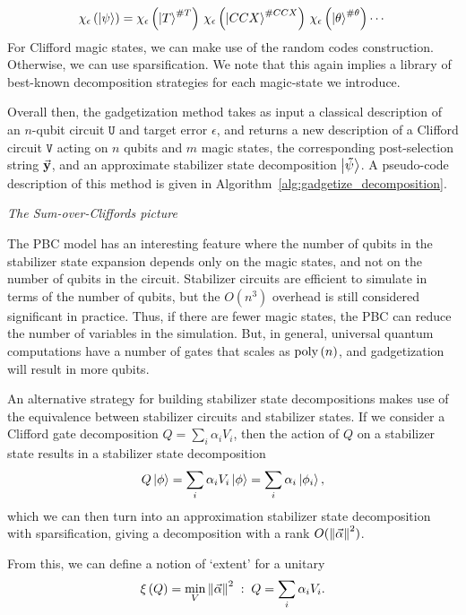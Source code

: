 \[\chi_{\epsilon}\left(\ket{\psi}\right) = \chi_{\epsilon}\left(\ket{T}^{\# T}\right)\,\chi_{\epsilon}\left(\ket{CCX}^{\# CCX}\right)\,\chi_{\epsilon}\left(\ket{\theta}^{\#\theta}\right)\cdots\]
For Clifford magic states, we can make use of the random codes construction. Otherwise, we can use sparsification. We note that this again implies a library of best-known decomposition strategies for each magic-state we introduce.\par
Overall then, the gadgetization method takes as input a classical description of an $n$-qubit circuit $\mathtt{U}$ and target error $\epsilon$, and returns a new description of a Clifford circuit $\mathtt{V}$ acting on $n$ qubits and $m$ magic states, the corresponding post-selection string $\va{y}$, and an approximate stabilizer state decomposition $\mathtt{\ket{\tilde{\psi}}}$. A pseudo-code description of this method is given in Algorithm~\ref{alg:gadgetize_decomposition}.\par
\large{\itshape{The Sum-over-Cliffords picture}}\par
The PBC model has an interesting feature where the number of qubits in the stabilizer state expansion depends only on the magic states, and not on the number of qubits in the circuit. Stabilizer circuits are efficient to simulate in terms of the number of qubits, but the $O(n^{3})$ overhead is still considered significant in practice. Thus, if there are fewer magic states, the PBC can reduce the number of variables in the simulation. But, in general, universal quantum computations have a number of gates that scales as $\text{poly}\left(n\right)$, and gadgetization will result in more qubits.\par
An alternative strategy for building stabilizer state decompositions makes use of the equivalence between stabilizer circuits and stabilizer states. If we consider a Clifford gate decomposition $Q=\sum_{i}\alpha_{i}V_{i}$, then the action of $Q$ on a stabilizer state results in a stabilizer state decomposition
\begin{equation}
Q\ket{\phi} = \sum_{i}\alpha_{i}V_{i}\ket{\phi} = \sum_{i}\alpha_{i}\ket{\phi_{i}},
\end{equation}
which we can then turn into an approximation stabilizer state decomposition with sparsification, giving a decomposition with a rank $O(\norm{\va{\alpha}}^{2})$.\par
From this, we can define a notion of `extent' for a unitary
\begin{equation}
\xi\left(Q\right) = \min_{V}\norm{\va{\alpha}}^{2} \;:\;Q=\sum_{i}\alpha_{i}V_{i}.
\end{equation}
